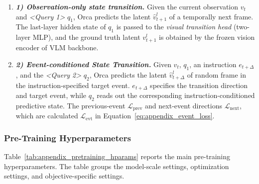 \documentclass{llmxive}
\begin{document}
\begin{enumerate}[
    leftmargin=1.35em,
    itemsep=0.35em,
    topsep=0.35em,
    parsep=0em
]
    \item[] \textit{\textbf{1) Observation-only state transition.}} Given the current observation \(v_t\) and \textit{<Query 1>} \(q_1\), Orca predicts the latent \(\hat{v}^l_{t+1}\) of a temporally next frame. The last-layer hidden state of \(q_1\) is passed to the \textit{visual transition head} (two-layer MLP), and the ground truth latent \(v^l_{t+1}\) is obtained by the frozen vision encoder of VLM backbone. 
    \item[] \textit{\textbf{2) Event-conditioned State Transition.}} Given \(v_t\), \(q_1\), an instruction \(e_{t+\Delta}\), and the \textit{<Query 2>} \(q_2\), Orca predicts the latent \(\hat{v}^l_{t+\Delta}\) of random frame in the instruction-specified target event. \(e_{t+\Delta}\) specifies the transition direction and target event, while \(q_2\) reads out the corresponding instruction-conditioned predictive state. The previous-event \(\mathcal{L}_{\mathrm{prev}}\) and next-event directions \(\mathcal{L}_{\mathrm{next}}\), which are calculated \(\mathcal{L}_{\mathrm{evt}}\) in Equation~\ref{eq:appendix_event_loss}. 
\end{enumerate}


\subsubsection{Pre-Training Hyperparameters} \label{sec:appendix_pretraining_hparams} 
Table~\ref{tab:appendix_pretraining_hparams} reports the main pre-training hyperparameters. The table groups the model-scale settings, optimization settings, and objective-specific settings.
\end{document}
